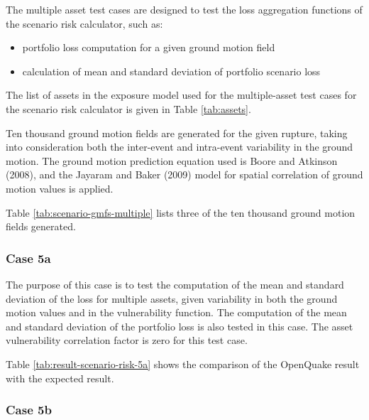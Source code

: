The multiple asset test cases are designed to test the loss aggregation functions of the scenario risk calculator, such as:

\begin{itemize}
\item portfolio loss computation for a given ground motion field
\item calculation of mean and standard deviation of portfolio scenario loss
\end{itemize}



The list of assets in the exposure model used for the multiple-asset test cases for the scenario risk calculator is given in Table \ref{tab:assets}.

Ten thousand ground motion fields are generated for the given rupture, taking into consideration both the inter-event and intra-event variability in the ground motion. The ground motion prediction equation used is Boore and Atkinson (2008), and the Jayaram and Baker (2009) model for spatial correlation of ground motion values is applied.



Table \ref{tab:scenario-gmfs-multiple} lists three of the ten thousand ground motion fields generated.

\subsubsection{Case 5a}
The purpose of this case is to test the computation of the mean and standard deviation of the loss for multiple assets, given variability in both the ground motion values and in the vulnerability function. The computation of the mean and standard deviation of the portfolio loss is also tested in this case. The asset vulnerability correlation factor is zero for this test case.




Table \ref{tab:result-scenario-risk-5a} shows the comparison of the OpenQuake result with the expected result.

\subsubsection{Case 5b}


